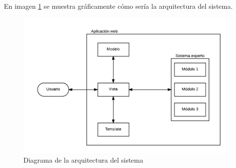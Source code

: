 En imagen \ref{fig4.2.1} se muestra gráficamente cómo sería la arquitectura del sistema.

\begin{figure}[H]
	\centering
	\includegraphics[scale=1]{imagenes/arquitectura.png}
	\caption{Diagrama de la arquitectura del sistema}
	\label{fig4.2.1}
\end{figure}